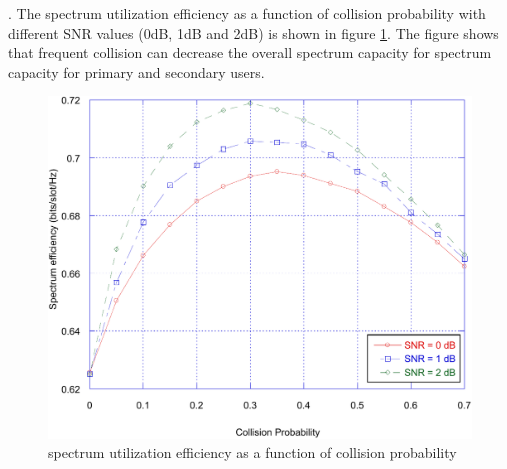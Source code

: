 \documentclass[twocolumn]{el-author}
\begin{document}
	. The spectrum utilization efficiency as a function of collision probability with different SNR values (0dB, 1dB and 2dB) is shown in figure \ref{fig:fig7err}. The figure shows that frequent collision can decrease the overall spectrum capacity for spectrum capacity for primary and secondary users. 


\begin{figure}
	\centering
	\includegraphics[width=0.5\linewidth]{./fig7_err}
	\caption{spectrum utilization efficiency as a function of collision probability}
	\label{fig:fig7err}
\end{figure}
	
	
	
	
%	
	
	
	
\end{document}

